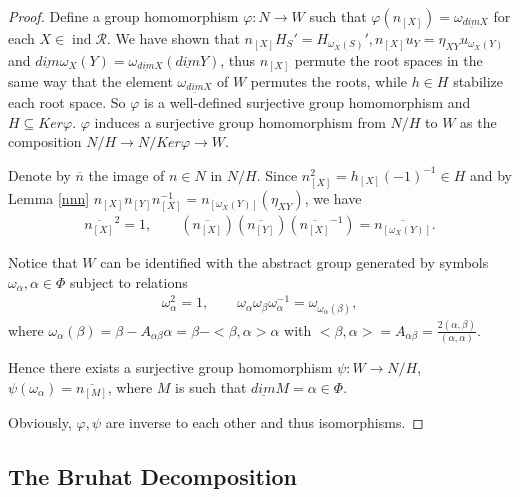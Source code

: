 \documentclass[12pt]{amsart}
\begin{document}
\begin{proof}
    Define a group homomorphism $\varphi:N\rightarrow W$ such that $\varphi(n_{[X]}) = \omega_{\underline{dim}X}$ for each $X \in \operatorname{ind}\mathcal{R}$.
    We have shown that $n_{[X]}H_S' = H_{\omega_X(S)}', n_{[X]}u_Y=\eta_{XY}u_{\omega_X(Y)}$ and $\underline{dim}\omega_X(Y) = \omega_{\underline{dim}X}(\underline{dim}Y)$, 
    thus $n_{[X]}$ permute the root spaces in the same way that the element $\omega_{\underline{dim}X}$ of $W$ permutes the roots, while $h \in H$ stabilize each root space.
    So $\varphi $ is a well-defined surjective group homomorphism and $H \subseteq Ker\varphi$.
    $\varphi$ induces a surjective group homomorphism from $N/H$ to $W$ as the composition $N/H \rightarrow N/Ker\varphi \rightarrow W$.

    Denote by $\overline{n}$ the image of $n\in N$ in $N/H$.
    Since $n_{[X]}^2 = h_{[X]}(-1)^{-1} \in H$ and by Lemma \ref{nnn} $n_{[X]}n_{[Y]}n_{[X]}^{-1} = n_{[\omega_X(Y)]}(\eta_{XY})$, we have
    \begin{align*}
        \overline{n_{[X]}}^2 = 1, \qquad (\overline{n_{[X]}})(\overline{n_{[Y]}})(\overline{n_{[X]}}^{-1}) = \overline{n_{[\omega_X(Y)]}}.
    \end{align*}

    Notice that $W$ can be identified with the abstract group generated by symbols $\omega_{\alpha}, \alpha \in \Phi$ subject to relations 
    \begin{align*}
        \omega_{\alpha}^2 = 1, \qquad \omega_{\alpha} \omega_{\beta} \omega_{\alpha}^{-1} = \omega_{\omega_{\alpha}(\beta)},
    \end{align*}
    where $\omega_{\alpha}(\beta) = \beta - A_{\alpha\beta}\alpha = \beta - <\beta,\alpha>\alpha$ with $<\beta,\alpha>=A_{\alpha\beta} = \frac{2(\alpha,\beta)}{(\alpha,\alpha)}$.

    Hence there exists a surjective group homomorphism $\psi:W \rightarrow N/H$, $\psi(\omega_{\alpha}) = \overline{n_{[M]}}$, where $M$ is such that $\underline{dim}M = \alpha \in \Phi$.
    
    Obviously, $\varphi,\psi$ are inverse to each other and thus isomorphisms.
\end{proof}






\subsection{The Bruhat Decomposition}
\end{document}
